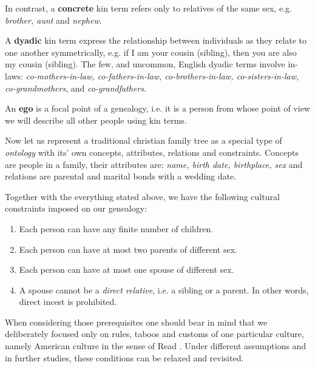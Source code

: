     \begin{definition}
        In contrast, a \textbf{concrete} kin term refers only to relatives of the same sex, e.g. \textit{brother, aunt} and
        \textit{nephew}.
    \end{definition}

    \begin{definition}
        A \textbf{dyadic} kin term express the relationship between individuals as they relate to one another symmetrically, e.g. if I
        am your cousin (sibling), then you are also my cousin (sibling). The few, and uncommon, English dyadic terms involve in-laws:
        \textit{co-mothers-in-law, co-fathers-in-law, co-brothers-in-law, co-sisters-in-law, co-grandmothers}, and
        \textit{co-grandfathers}.
    \end{definition}

    \begin{definition}
        An \textbf{ego} is a focal point of a genealogy, i.e. it is a person from whose point of view we will describe all other
        people using kin terms.
    \end{definition}

    Now let us represent a traditional christian family tree as a special type of \textit{ontology} with its' own concepts,
    attributes, relations and constraints. Concepts are people in a family, their attributes are: \textit{name, birth date,
    birthplace, sex} and relations are parental and marital bonds with a wedding date.

    Together with the everything stated above, we have the following cultural constraints imposed on our genealogy:
    \begin{enumerate}
        \label{en:req}
        \item{Each person can have any finite number of children.}
        \item{Each person can have at most two parents of different sex.}
        \item{Each person can have at most one spouse of different sex.}
        \item{A spouse cannot be a \textit{direct relative}, i.e. a sibling or a parent. In other words, direct incest is
            prohibited.}
    \end{enumerate}

    When considering those prerequisites one should bear in mind that we deliberately focused only on rules, taboos and
    customs of one particular culture, namely American culture in the sense of Read \cite{read}. Under different assumptions and
    in further studies, these conditions can be relaxed and revisited.


